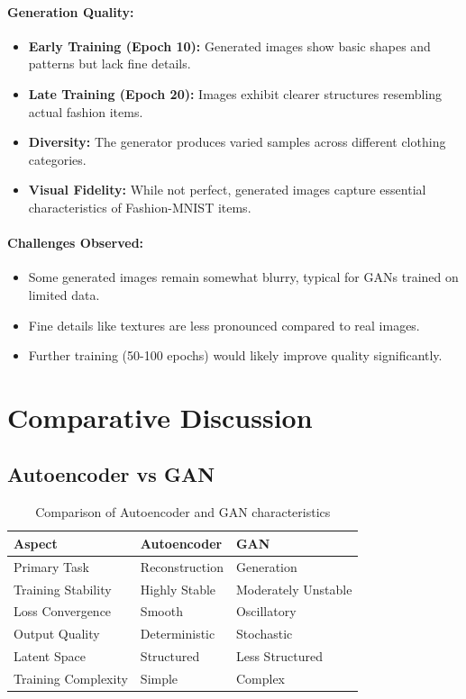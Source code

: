 \documentclass[11pt,a4paper]{article}
\begin{document}
\paragraph{Generation Quality:}
\begin{itemize}
    \item \textbf{Early Training (Epoch 10):} Generated images show basic shapes and patterns but lack fine details.
    \item \textbf{Late Training (Epoch 20):} Images exhibit clearer structures resembling actual fashion items.
    \item \textbf{Diversity:} The generator produces varied samples across different clothing categories.
    \item \textbf{Visual Fidelity:} While not perfect, generated images capture essential characteristics of Fashion-MNIST items.
\end{itemize}

\paragraph{Challenges Observed:}
\begin{itemize}
    \item Some generated images remain somewhat blurry, typical for GANs trained on limited data.
    \item Fine details like textures are less pronounced compared to real images.
    \item Further training (50-100 epochs) would likely improve quality significantly.
\end{itemize}

\section{Comparative Discussion}

\subsection{Autoencoder vs GAN}

\begin{table}[H]
\centering
\begin{tabular}{lll}
\toprule
\textbf{Aspect} & \textbf{Autoencoder} & \textbf{GAN} \\
\midrule
Primary Task & Reconstruction & Generation \\
Training Stability & Highly Stable & Moderately Unstable \\
Loss Convergence & Smooth & Oscillatory \\
Output Quality & Deterministic & Stochastic \\
Latent Space & Structured & Less Structured \\
Training Complexity & Simple & Complex \\
\bottomrule
\end{tabular}
\caption{Comparison of Autoencoder and GAN characteristics}
\end{table}
\end{document}
